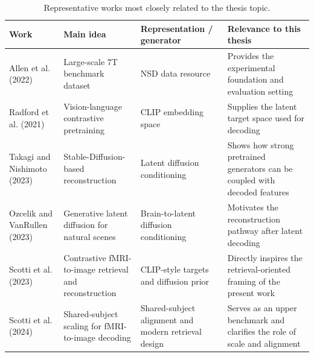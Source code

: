 \begin{table}[htbp]
\centering
\small
\begin{tabularx}{\textwidth}{>{\raggedright\arraybackslash}p{2.7cm} >{\raggedright\arraybackslash}p{2.6cm} >{\raggedright\arraybackslash}p{3.2cm} >{\raggedright\arraybackslash}X}
\toprule
\textbf{Work} & \textbf{Main idea} & \textbf{Representation / generator} & \textbf{Relevance to this thesis} \\
\midrule
Allen et al. (2022) \cite{Allen2022} & Large-scale 7T benchmark dataset & NSD data resource & Provides the experimental foundation and evaluation setting \\
Radford et al. (2021) \cite{Radford2021} & Vision-language contrastive pretraining & CLIP embedding space & Supplies the latent target space used for decoding \\
Takagi and Nishimoto (2023) \cite{Takagi2023} & Stable-Diffusion-based reconstruction & Latent diffusion conditioning & Shows how strong pretrained generators can be coupled with decoded features \\
Ozcelik and VanRullen (2023) \cite{Ozcelik2023} & Generative latent diffusion for natural scenes & Brain-to-latent diffusion conditioning & Motivates the reconstruction pathway after latent decoding \\
Scotti et al. (2023) \cite{Scotti2023} & Contrastive fMRI-to-image retrieval and reconstruction & CLIP-style targets and diffusion prior & Directly inspires the retrieval-oriented framing of the present work \\
Scotti et al. (2024) \cite{Scotti2024} & Shared-subject scaling for fMRI-to-image decoding & Shared-subject alignment and modern retrieval design & Serves as an upper benchmark and clarifies the role of scale and alignment \\
\bottomrule
\end{tabularx}
\caption{Representative works most closely related to the thesis topic.}
\label{tab:related_work}
\end{table}

